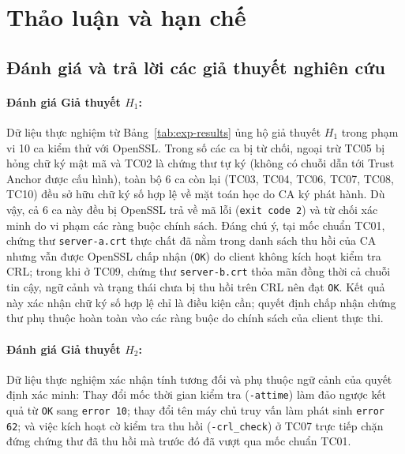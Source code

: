 \section{Thảo luận và hạn chế}
\label{sec:exp-limitations}

\subsection{Đánh giá và trả lời các giả thuyết nghiên cứu}
\label{subsec:eval-hypotheses}

\paragraph{Đánh giá Giả thuyết $H_1$:}
Dữ liệu thực nghiệm từ Bảng~\ref{tab:exp-results} ủng hộ giả thuyết $H_1$ trong phạm vi 10 ca kiểm thử với OpenSSL. Trong số các ca bị từ chối, ngoại trừ TC05 bị hỏng chữ ký mật mã và TC02 là chứng thư tự ký (không có chuỗi dẫn tới Trust Anchor được cấu hình), toàn bộ 6 ca còn lại (TC03, TC04, TC06, TC07, TC08, TC10) đều sở hữu chữ ký số hợp lệ về mặt toán học do CA ký phát hành. Dù vậy, cả 6 ca này đều bị OpenSSL trả về mã lỗi (\texttt{exit code 2}) và từ chối xác minh do vi phạm các ràng buộc chính sách. Đáng chú ý, tại mốc chuẩn TC01, chứng thư \texttt{server-a.crt} thực chất đã nằm trong danh sách thu hồi của CA nhưng vẫn được OpenSSL chấp nhận (\texttt{OK}) do client không kích hoạt kiểm tra CRL; trong khi ở TC09, chứng thư \texttt{server-b.crt} thỏa mãn đồng thời cả chuỗi tin cậy, ngữ cảnh và trạng thái chưa bị thu hồi trên CRL nên đạt \texttt{OK}. Kết quả này xác nhận chữ ký số hợp lệ chỉ là điều kiện cần; quyết định chấp nhận chứng thư phụ thuộc hoàn toàn vào các ràng buộc do chính sách của client thực thi.

\paragraph{Đánh giá Giả thuyết $H_2$:}
Dữ liệu thực nghiệm xác nhận tính tương đối và phụ thuộc ngữ cảnh của quyết định xác minh: Thay đổi mốc thời gian kiểm tra (\texttt{-attime}) làm đảo ngược kết quả từ \texttt{OK} sang \texttt{error 10}; thay đổi tên máy chủ truy vấn làm phát sinh \texttt{error 62}; và việc kích hoạt cờ kiểm tra thu hồi (\texttt{-crl\_check}) ở TC07 trực tiếp chặn đứng chứng thư đã thu hồi mà trước đó đã vượt qua mốc chuẩn TC01. 

